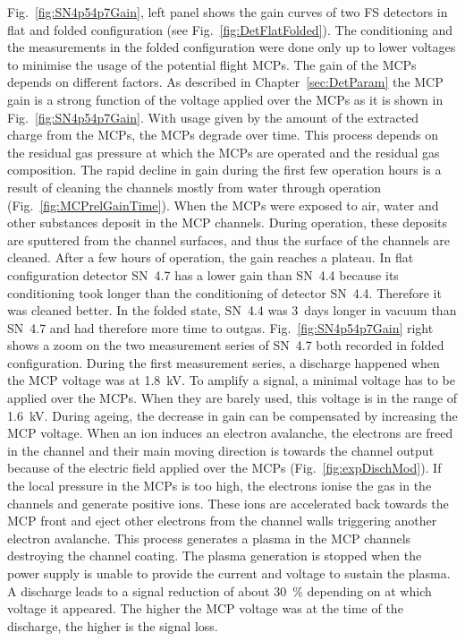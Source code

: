 	Fig.~\ref{fig:SN4p54p7Gain}, left panel shows the gain curves of two FS detectors in flat and folded configuration (see Fig.~\ref{fig:DetFlatFolded}). The conditioning and the measurements in the folded configuration were done only up to lower voltages to minimise the usage of the potential flight MCPs. The gain of the MCPs depends on different factors. As described in Chapter~\ref{sec:DetParam} the MCP gain is a strong function of the voltage applied over the MCPs as it is shown in Fig.~\ref{fig:SN4p54p7Gain}. With usage given by the amount of the extracted charge from the MCPs, the MCPs degrade over time. This process depends on the residual gas pressure at which the MCPs are operated and the residual gas composition. The rapid decline in gain during the first few operation hours is a result of cleaning the channels mostly from water through operation (Fig.~\ref{fig:MCPrelGainTime}). When the MCPs were exposed to air, water and other substances deposit in the MCP channels. During operation, these deposits are sputtered from the channel surfaces, and thus the surface of the channels are cleaned. After a few hours of operation, the gain reaches a plateau. In flat configuration detector SN~4.7 has a lower gain than SN~4.4 because its conditioning took longer than the conditioning of detector SN~4.4. Therefore it was cleaned better. In the folded state, SN~4.4 was 3~days longer in vacuum than SN~4.7 and had therefore more time to outgas. Fig.~\ref{fig:SN4p54p7Gain} right shows a zoom on the two measurement series of SN~4.7 both recorded in folded configuration. During the first measurement series, a discharge happened when the MCP voltage was at 1.8~kV. To amplify a signal, a minimal voltage has to be applied over the MCPs. When they are barely used, this voltage is in the range of 1.6~kV. During ageing, the decrease in gain can be compensated by increasing the MCP voltage. When an ion induces an electron avalanche, the electrons are freed in the channel and their main moving direction is towards the channel output because of the electric field applied over the MCPs (Fig.~\ref{fig:expDischMod}). If the local pressure in the MCPs is too high, the electrons ionise the gas in the channels and generate positive ions. These ions are accelerated back towards the MCP front and eject other electrons from the channel walls triggering another electron avalanche. This process generates a plasma in the MCP channels destroying the channel coating. The plasma generation is stopped when the power supply is unable to provide the current and voltage to sustain the plasma. A discharge leads to a signal reduction of about 30~\% depending on at which voltage it appeared. The higher the MCP voltage was at the time of the discharge, the higher is the signal loss. \\
